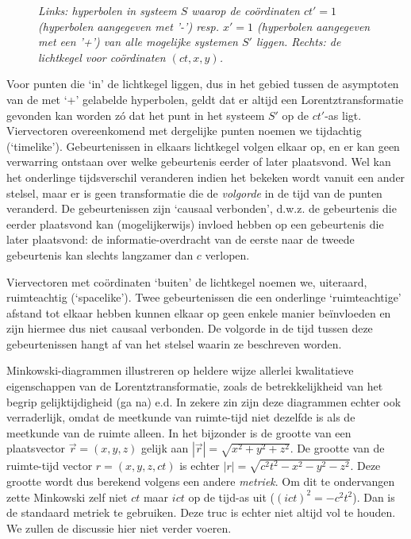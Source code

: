 \begin{figure}[ht]
\centering
\caption{{\sl Links: hyperbolen in systeem $S$ waarop de co\"{o}rdinaten $ct' = 1$ 
(hyperbolen aangegeven met '-') resp. $x' = 1$ (hyperbolen aangegeven
met een '+') van alle mogelijke systemen $S'$ liggen. Rechts: de lichtkegel voor co\"ordinaten $(ct,x,y)$.}}
\label{f:mink}
\end{figure}


Voor punten die `in' de lichtkegel liggen, dus in het gebied tussen de
asymptoten van de met `+' gelabelde hyperbolen, geldt dat er altijd
een Lorentztransformatie gevonden kan worden z\'{o} dat het punt in
het systeem $S'$ op de $ct'$-as ligt.  Viervectoren overeenkomend met
dergelijke punten noemen we tijdachtig (`timelike'). Gebeurtenissen in
elkaars lichtkegel volgen elkaar op, en er kan geen verwarring
ontstaan over welke gebeurtenis eerder of later plaatsvond. Wel kan het
onderlinge tijdsverschil veranderen indien het bekeken wordt vanuit een ander
stelsel, maar er is geen transformatie die de {\it volgorde} in de
tijd van de punten veranderd.  De gebeurtenissen zijn `causaal
verbonden', d.w.z. de gebeurtenis die eerder plaatsvond kan (mogelijkerwijs) invloed
hebben op een gebeurtenis die later plaatsvond: de informatie-overdracht van de eerste naar 
de tweede gebeurtenis kan slechts langzamer dan $c$ verlopen.



Viervectoren met co\"{o}rdinaten `buiten' de lichtkegel noemen we,
uiteraard, ruimteachtig (`spacelike'). Twee gebeurtenissen die een
onderlinge `ruimteachtige' afstand tot elkaar hebben kunnen elkaar op geen enkele manier
beïnvloeden en zijn hiermee dus niet causaal verbonden. De volgorde in
de tijd tussen deze gebeurtenissen hangt af van het stelsel waarin ze
beschreven worden. 



Minkowski-diagrammen illustreren op heldere wijze allerlei
 kwalitatieve eigenschappen van de Lorentztransformatie, zoals de 
betrekkelijkheid van het begrip gelijktijdigheid (ga na) e.d.
In zekere zin zijn deze diagrammen echter ook verraderlijk, omdat de meetkunde 
van ruimte-tijd niet dezelfde is als de meetkunde van de ruimte alleen.
In het bijzonder is de grootte van een plaatsvector 
$\vec{r} = (x, y, z)$ gelijk aan $|\vec{r}| = \sqrt{x^{2} + y^{2} + z^{2}}$.
De grootte van de ruimte-tijd vector $r = (x, y, z, ct)$ is echter
$|r| = \sqrt{c^2 t^2 - x^{2} - y^{2} - z^{2}}$.
Deze grootte wordt dus berekend volgens een andere {\sl metriek}.
Om dit te ondervangen zette Minkowski zelf niet $ct$ maar $ict$ op de tijd-as
uit ($(ict)^{2} =  -c^{2}t^{2}$).
Dan is de standaard metriek te gebruiken. Deze truc is echter niet altijd vol
te houden.
We zullen de discussie hier niet verder voeren.

